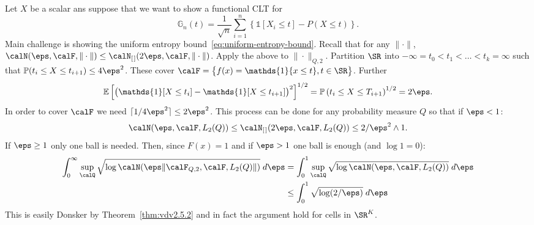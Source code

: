 \begin{example}
	\label{ex:cells-donsker}
	Let \(X\) be a scalar ans suppose that we want to show a functional CLT for
	 \[
		 \mathbb{G}_n(t) = \frac{1}{\sqrt n}\sum_{i=1}^n \left\{\mathds{1}[X_i\leq t]-P(X\leq t)\right\} 
	.\]
	Main challenge is showing the uniform entropy bound~\eqref{eq:uniform-entropy-bound}. Recall that for any \(\|\cdot\|\), \(\calN(\eps,\calF,\|\cdot\|)\leq \calN_{[\hspace{0.1em}]}(2\eps,\calF,\|\cdot\|)\). Apply the above to \(\|\cdot\|_{Q,2}\). Partition \(\SR\) into  \(-\infty=t_0<t_1<\dots<t_k= \infty\) such that \(\P(t_i\leq X\leq t_{i+1}) \leq 4\eps^2\). These cover \(\calF= \left\{f(x)=\mathds{1}\{x\leq t\}, t\in\SR \right\}\). Further
	\[
		\E\left[\left(\mathds{1}[X\leq t_i]-\mathds{1}[X\leq t_{i+1}]\right)^2\right]^{1/2} = \P\left(t_i\leq X\leq T_{i+1}\right)^{1/2} = 2\eps
	.\]
	In order to cover \(\calF\) we need  \(\lceil 1/4\eps^2\rceil \leq 2\eps^2\). This process can be done for any probability measure \(Q\) so that if \(\eps < 1\):
	 \[
		 \calN(\eps,\calF,L_2(Q)) \leq  \calN_{[\hspace{0.1em}]}(2\eps,\calF,L_2(Q)) \leq 2/\eps^2  \wedge 1
	.\]
	If \(\eps \geq 1\) only one ball is needed. Then, since \(F(x)=1\) and if  \(\eps>1\) one ball is enough (and \(\log 1 =0\)):
	\begin{align*}
		\int_{0}^{\infty} \sup_{\calQ} \sqrt{\log\calN(\eps\|\calF_{Q,2},\calF,L_2(Q)\|)}\;d\eps &= \int_{0}^{1} \sup_{\calQ}\sqrt{\log\calN(\eps,\calF,L_2(Q))}\;d\eps \\
											 &\leq \int_{0}^{1} \sqrt{\log (2/\eps)}\;d\eps 
	\end{align*}
	This is easily Donsker by Theorem~\ref{thm:vdv2.5.2} and in fact the argument hold for cells in \(\SR^K\). 
\end{example}
